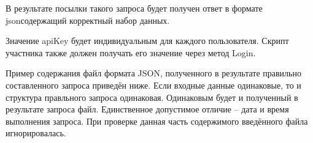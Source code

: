 В результате посылки такого запроса будет получен ответ в формате jsonсодержащий корректный набор данных.

Значение apiKey будет индивидуальным для каждого пользователя. Скрипт участника также должен получать его значение через метод Login.

\answerMath

Пример содержания файл формата JSON, полученного в результате правильно составленного запроса приведён ниже. Если входные данные одинаковые, то и структура правльного запроса одинаковая. Одинаковым будет и полученный в результате запроса файл. Единственное допустимое отличие – дата и время выполнения запроса. При проверке данная часть содержимого введённого файла игнорировалась.

